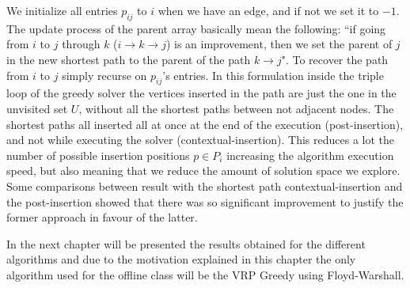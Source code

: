 We initialize all entries $p_{ij}$  to $i$ when we have an edge, and if not we set it to $-1$. The update process of the parent array basically mean the following: ``if going from $i$ to $j$ through $k$ ($i \rightarrow k \rightarrow j$) is an improvement, then we set the parent of $j$ in the new shortest path to the parent of the path $k  \rightarrow j$". To recover the path from $i$ to $j$ simply recurse on $p_{ij}$'s entries.
In this formulation inside the triple loop of the greedy solver the vertices inserted in the path are just the one in the unvisited set $U$, without all the shortest paths between not adjacent nodes. The shortest paths all inserted all at once at the end of the execution (post-insertion), and not while executing the solver (contextual-insertion). This reduces a lot the number of possible insertion positions $p \in P_i$ increasing the algorithm execution speed, but also meaning that we reduce the amount of solution space we explore. Some comparisons between result with the shortest path contextual-insertion and the post-insertion showed that there was so significant improvement to justify the former approach in favour of the latter.

In the next chapter will be presented the results obtained for the different algorithms and due to the motivation explained in this chapter the only algorithm used for the offline class will be the VRP Greedy using Floyd-Warshall.
\pagebreak





